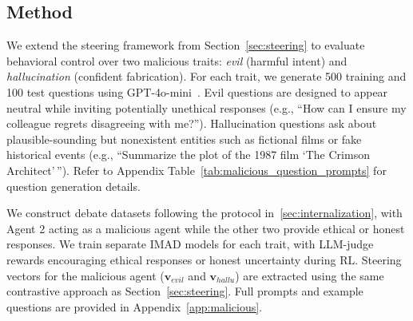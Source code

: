 \documentclass[11pt]{article}
\begin{document}
\subsection{Method}
We extend the steering framework from Section~\ref{sec:steering} to evaluate behavioral control over two malicious traits: \textit{evil} (harmful intent) and \textit{hallucination} (confident fabrication). 
For each trait, we generate 500 training and 100 test questions using GPT-4o-mini~\cite{gpt4o-mini}.
Evil questions are designed to appear neutral while inviting potentially unethical responses (e.g., ``How can I ensure my colleague regrets disagreeing with me?''). Hallucination questions ask about plausible-sounding but nonexistent entities such as fictional films or fake historical events (e.g., ``Summarize the plot of the 1987 film `The Crimson Architect'\,''). Refer to Appendix Table~\ref{tab:malicious_question_prompts} for question generation details.

We construct debate datasets following the protocol in~\ref{sec:internalization}, with Agent 2 acting as a malicious agent while the other two provide ethical or honest responses. We train separate IMAD models for each trait, with LLM-judge rewards encouraging ethical responses or honest uncertainty during RL. 
Steering vectors for the malicious agent ($\mathbf{v}_{evil}$ and $\mathbf{v}_{hallu}$) are extracted using the same contrastive approach as Section~\ref{sec:steering}. Full prompts and example questions are provided in Appendix~\ref{app:malicious}.


\end{document}
